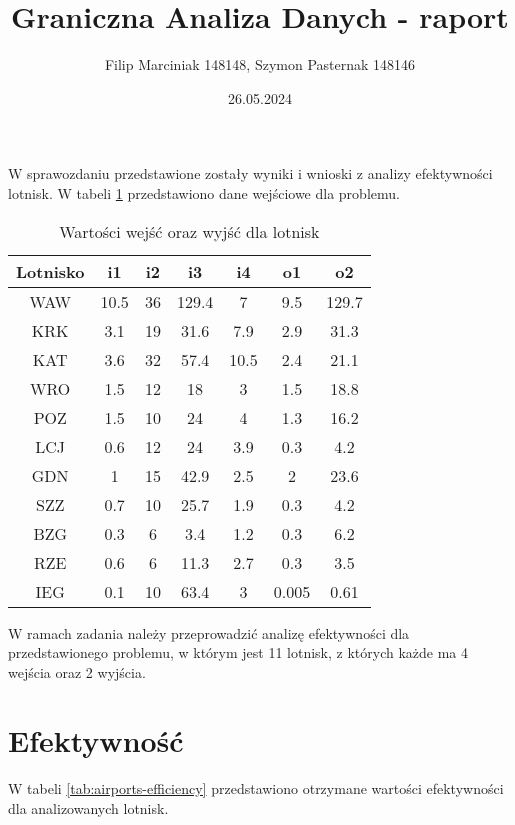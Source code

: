 \documentclass[a4paper,12pt]{article}
\author{{Filip Marciniak 148148, Szymon Pasternak 148146}}
\date{{26.05.2024}}
\title{Graniczna Analiza Danych - raport}
\begin{document}
\maketitle

W sprawozdaniu przedstawione zostały wyniki i wnioski z analizy efektywności lotnisk.
W tabeli \ref{tab:airports} przedstawiono dane wejściowe dla problemu.

\begin{table}[H]
    \centering
    \begin{tabular}{c|cccc|cc}
    \hline
         Lotnisko & i1 & i2 & i3 & i4 & o1 & o2  \\ \hline
         WAW & 10.5 & 36 & 129.4 & 7 & 9.5 & 129.7 \\
         KRK & 3.1 & 19 & 31.6 & 7.9 & 2.9 & 31.3 \\
         KAT & 3.6 & 32 & 57.4 & 10.5 & 2.4 & 21.1 \\
         WRO & 1.5 & 12 & 18 & 3 & 1.5 & 18.8 \\
         POZ & 1.5 & 10 & 24 & 4 & 1.3 & 16.2 \\
         LCJ & 0.6 & 12 & 24 & 3.9 & 0.3 & 4.2 \\
         GDN & 1 & 15 & 42.9 & 2.5 & 2 & 23.6 \\
         SZZ & 0.7 & 10 & 25.7 & 1.9 & 0.3 & 4.2 \\
         BZG & 0.3 & 6 & 3.4 & 1.2 & 0.3 & 6.2 \\
         RZE & 0.6 & 6 & 11.3 & 2.7 & 0.3 & 3.5 \\
         IEG & 0.1 & 10 & 63.4 & 3 & 0.005 & 0.61 \\
    \end{tabular}
    \caption{Wartości wejść oraz wyjść dla lotnisk}
    \label{tab:airports}
\end{table}

\noindent W ramach zadania należy przeprowadzić analizę efektywności dla przedstawionego problemu, w którym jest 11 lotnisk, z których każde ma 4 wejścia oraz 2 wyjścia.


\section{Efektywność}

W tabeli \ref{tab:airports-efficiency} przedstawiono otrzymane wartości efektywności dla analizowanych lotnisk.
\end{document}
